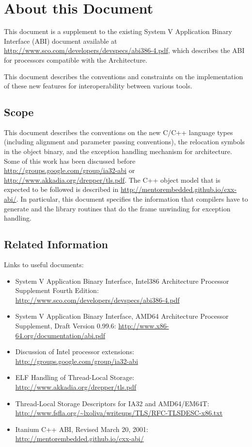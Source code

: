 \chapter{About this Document\label{intro}}

This document is a supplement to the existing \xARCH System V
Application Binary Interface (ABI) document available at
\url{http://www.sco.com/developers/devspecs/abi386-4.pdf},
which describes the ABI for processors compatible with the
\xARCH Architecture.

This document describes the conventions and constraints on the
implementation of these new features for interoperability between
various tools.

\section{Scope}

This document describes the conventions on the new C/C++ language types
(including alignment and parameter passing conventions), the relocation
symbols in the object binary, and the exception handling mechanism for
\xARCH architecture.  Some of this work has been discussed before
\url{http://groups.google.com/group/ia32-abi} or
\url{http://www.akkadia.org/drepper/tls.pdf}. The C++ object model that
is expected to be followed is described in
\url{http://mentorembedded.github.io/cxx-abi/}.  In particular,
this document specifies the information that compilers have to generate
and the library routines that do the frame unwinding for exception
handling.

\section{Related Information}

Links to useful documents:
\begin{itemize}
 \item System V Application Binary Interface, Intel386{\texttrademark} Architecture
       Processor Supplement Fourth Edition:
       \url{http://www.sco.com/developers/devspecs/abi386-4.pdf}
 \item System V Application Binary Interface, AMD64 Architecture Processor
       Supplement, Draft Version 0.99.6:
       \url{http://www.x86-64.org/documentation/abi.pdf}
 \item Discussion of Intel processor extensions:
       \url{http://groups.google.com/group/ia32-abi}
 \item ELF Handling of Thread-Local Storage:
       \url{http://www.akkadia.org/drepper/tls.pdf}
 \item Thread-Local Storage Descriptors for IA32 and AMD64/EM64T:
       \url{http://www.fsfla.org/~lxoliva/writeups/TLS/RFC-TLSDESC-x86.txt}
 \item Itanium C++ ABI, Revised March 20, 2001:
       \url{http://mentorembedded.github.io/cxx-abi/}
\end{itemize}

